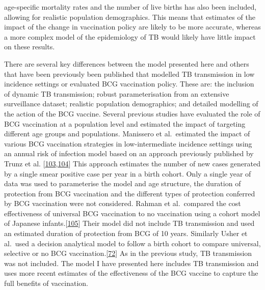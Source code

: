 \documentclass[11pt,twoside]{bristolthesis}
\begin{document}
age-specific mortality rates and the number of live births has also been included, allowing for realistic population demographics. This means that estimates of the impact of the change in vaccination policy are likely to be more accurate, whereas a more complex model of the epidemiology of TB would likely have little impact on these results.
  
  There are several key differences between the model presented here and others that have been previously been published that modelled TB transmission in low incidence settings or evaluated BCG vaccination policy. These are: the inclusion of dynamic TB transmission; robust parameterisation from an extensive surveillance dataset; realistic population demographics; and detailed modelling of the action of the BCG vaccine. Several previous studies have evaluated the role of BCG vaccination at a population level and estimated the impact of targeting different age groups and populations. Manissero et al.~estimated the impact of various BCG vaccination strategies in low-intermediate incidence settings using an annual risk of infection model based on an approach previously published by Trunz et al. {[}\protect\hyperlink{ref-Manissero2008a}{103},\protect\hyperlink{ref-Trunz2006}{104}{]} This approach estimates the number of new cases generated by a single smear positive case per year in a birth cohort. Only a single year of data was used to parameterise the model and age structure, the duration of protection from BCG vaccination and the different types of protection conferred by BCG vaccination were not considered. Rahman et al.~compared the cost effectiveness of universal BCG vaccination to no vaccination using a cohort model of Japanese infants.{[}\protect\hyperlink{ref-Rahman2001a}{105}{]} Their model did not include TB transmission and used an estimated duration of protection from BCG of 10 years. Similarly Usher et al.~used a decision analytical model to follow a birth cohort to compare universal, selective or no BCG vaccination.{[}\protect\hyperlink{ref-Usher2016}{72}{]} As in the previous study, TB transmission was not included. The model I have presented here includes TB transmission and uses more recent estimates of the effectiveness of the BCG vaccine to capture the full benefits of vaccination.
  
\end{document}
